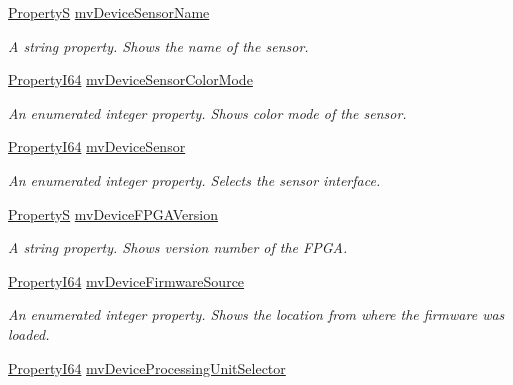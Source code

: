 \begin{DoxyCompactItemize}
\hyperlink{classmv_i_m_p_a_c_t_1_1acquire_1_1_property_s}{Property\+S} \hyperlink{classmv_i_m_p_a_c_t_1_1acquire_1_1_gen_i_cam_1_1_device_control_ab1b2a71a999f0078f7f625a066bc1a1f}{mv\+Device\+Sensor\+Name}
\begin{DoxyCompactList}\small\item\em A string property. Shows the name of the sensor. \end{DoxyCompactList}\item 
\hyperlink{group___common_interface_ga81749b2696755513663492664a18a893}{Property\+I64} \hyperlink{classmv_i_m_p_a_c_t_1_1acquire_1_1_gen_i_cam_1_1_device_control_a51865e07a49ab782998b913c8fb789b4}{mv\+Device\+Sensor\+Color\+Mode}
\begin{DoxyCompactList}\small\item\em An enumerated integer property. Shows color mode of the sensor. \end{DoxyCompactList}\item 
\hyperlink{group___common_interface_ga81749b2696755513663492664a18a893}{Property\+I64} \hyperlink{classmv_i_m_p_a_c_t_1_1acquire_1_1_gen_i_cam_1_1_device_control_a717aab62ac9cc3db3531db15a20524cd}{mv\+Device\+Sensor}
\begin{DoxyCompactList}\small\item\em An enumerated integer property. Selects the sensor interface. \end{DoxyCompactList}\item 
\hyperlink{classmv_i_m_p_a_c_t_1_1acquire_1_1_property_s}{Property\+S} \hyperlink{classmv_i_m_p_a_c_t_1_1acquire_1_1_gen_i_cam_1_1_device_control_ac6f8194d5d7cf838ce906f2e66aff2a5}{mv\+Device\+F\+P\+G\+A\+Version}
\begin{DoxyCompactList}\small\item\em A string property. Shows version number of the F\+P\+G\+A. \end{DoxyCompactList}\item 
\hyperlink{group___common_interface_ga81749b2696755513663492664a18a893}{Property\+I64} \hyperlink{classmv_i_m_p_a_c_t_1_1acquire_1_1_gen_i_cam_1_1_device_control_a0e0cc359d7bf6588c9143fb5a5adadff}{mv\+Device\+Firmware\+Source}
\begin{DoxyCompactList}\small\item\em An enumerated integer property. Shows the location from where the firmware was loaded. \end{DoxyCompactList}\item 
\hyperlink{group___common_interface_ga81749b2696755513663492664a18a893}{Property\+I64} \hyperlink{classmv_i_m_p_a_c_t_1_1acquire_1_1_gen_i_cam_1_1_device_control_a1bcab490cda64eba7273899ba2298d81}{mv\+Device\+Processing\+Unit\+Selector}

\end{DoxyCompactItemize}
